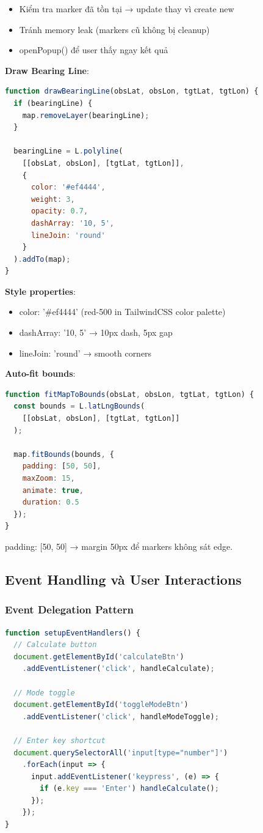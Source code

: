 \begin{itemize}
    \item Kiểm tra marker đã tồn tại → update thay vì create new
    \item Tránh memory leak (markers cũ không bị cleanup)
    \item openPopup() để user thấy ngay kết quả
\end{itemize}

\textbf{Draw Bearing Line}:
\begin{lstlisting}[language=JavaScript]
function drawBearingLine(obsLat, obsLon, tgtLat, tgtLon) {
  if (bearingLine) {
    map.removeLayer(bearingLine);
  }
  
  bearingLine = L.polyline(
    [[obsLat, obsLon], [tgtLat, tgtLon]], 
    {
      color: '#ef4444',
      weight: 3,
      opacity: 0.7,
      dashArray: '10, 5',
      lineJoin: 'round'
    }
  ).addTo(map);
}
\end{lstlisting}

\textbf{Style properties}:
\begin{itemize}
    \item color: '\#ef4444' (red-500 in TailwindCSS color palette)
    \item dashArray: '10, 5' → 10px dash, 5px gap
    \item lineJoin: 'round' → smooth corners
\end{itemize}

\textbf{Auto-fit bounds}:
\begin{lstlisting}[language=JavaScript]
function fitMapToBounds(obsLat, obsLon, tgtLat, tgtLon) {
  const bounds = L.latLngBounds(
    [[obsLat, obsLon], [tgtLat, tgtLon]]
  );
  
  map.fitBounds(bounds, {
    padding: [50, 50],
    maxZoom: 15,
    animate: true,
    duration: 0.5
  });
}
\end{lstlisting}

padding: [50, 50] → margin 50px để markers không sát edge.

\subsection{Event Handling và User Interactions}

\subsubsection{Event Delegation Pattern}

\begin{lstlisting}[language=JavaScript]
function setupEventHandlers() {
  // Calculate button
  document.getElementById('calculateBtn')
    .addEventListener('click', handleCalculate);
  
  // Mode toggle
  document.getElementById('toggleModeBtn')
    .addEventListener('click', handleModeToggle);
  
  // Enter key shortcut
  document.querySelectorAll('input[type="number"]')
    .forEach(input => {
      input.addEventListener('keypress', (e) => {
        if (e.key === 'Enter') handleCalculate();
      });
    });
}
\end{lstlisting}

